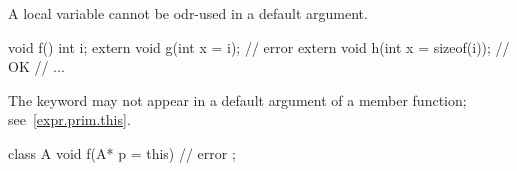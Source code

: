 \pnum
\begin{note}
A local variable cannot be odr-used
in a default argument.
\end{note}
\begin{example}
\begin{codeblock}
void f() {
  int i;
  extern void g(int x = i);         // error
  extern void h(int x = sizeof(i)); // OK
  // ...
}
\end{codeblock}
\end{example}

\pnum
\begin{note}
The keyword
may not appear in a default argument of a member function;
see~\ref{expr.prim.this}.
\begin{example}
\begin{codeblock}
class A {
  void f(A* p = this) { }           // error
};
\end{codeblock}
\end{example}
\end{note}

